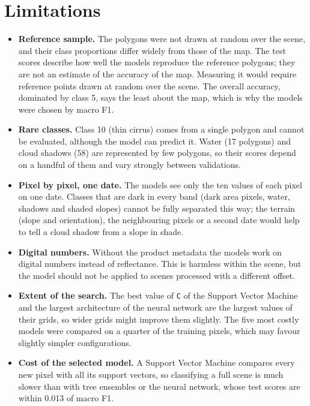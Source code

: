 \documentclass[11pt,a4paper]{article}
\begin{document}
\section{Limitations}

\begin{itemize}
  \item \textbf{Reference sample.} The polygons were not drawn at random over
  the scene, and their class proportions differ widely from those of the map.
  The test scores describe how well the models reproduce the reference
  polygons; they are not an estimate of the accuracy of the map. Measuring it
  would require reference points drawn at random over the scene. The
  overall accuracy, dominated by class 5, says the least about the map, which
  is why the models were chosen by macro F1.
  \item \textbf{Rare classes.} Class 10 (thin cirrus) comes from a single
  polygon and cannot be evaluated, although the model can predict it. Water
  (17 polygons) and cloud shadows (58) are represented by few polygons, so
  their scores depend on a handful of them and vary strongly between
  validations.
  \item \textbf{Pixel by pixel, one date.} The models see only the ten values
  of each pixel on one date. Classes that are dark in every band (dark area
  pixels, water, shadows and shaded slopes) cannot be fully separated this
  way; the terrain (slope and orientation), the neighbouring pixels or a second
  date would help to tell a cloud shadow from a slope in shade.
  \item \textbf{Digital numbers.} Without the product metadata the models work
  on digital numbers instead of reflectance. This is harmless within the scene,
  but the model should not be applied to scenes processed with a different
  offset.
  \item \textbf{Extent of the search.} The best value of \texttt{C} of the
  Support Vector Machine and the largest architecture of the neural network
  are the largest values of their grids, so wider grids might improve them
  slightly. The five most costly models were compared on a quarter of the
  training pixels, which may favour slightly simpler configurations.
  \item \textbf{Cost of the selected model.} A Support Vector Machine compares
  every new pixel with all its support vectors, so classifying a full scene is
  much slower than with tree ensembles or the neural network, whose test
  scores are within 0.013 of macro F1.
\end{itemize}
\end{document}
